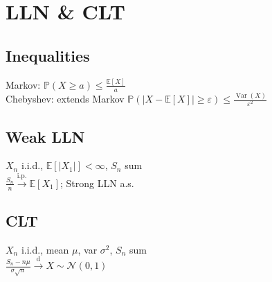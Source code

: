 \section{LLN \& CLT}
	\subsection*{Inequalities}
	Markov: $\mathbb{P}\left(X\geq a\right)\leq\frac{\mathbb{E}\left[X\right]}{a}$\\
	Chebyshev: extends Markov $\mathbb{P}\left(\left|X - \mathbb{E}\left[X\right]\right|\geq\varepsilon\right)\leq\frac{\operatorname{Var}\left(X\right)}{\varepsilon^{2}}$
	
	\subsection*{Weak LLN}
	$X_{n}$ i.i.d., $\mathbb{E}\left[\left|X_{1}\right|\right] < \infty$, $S_{n}$ sum\\
	$\frac{S_{n}}{n}\stackrel{\text{i.p.}}{\to}\mathbb{E}\left[X_{1}\right]$; Strong LLN a.s.
	
	\subsection*{CLT}
	$X_{n}$ i.i.d., mean $\mu$, var $\sigma^{2}$, $S_{n}$ sum\\
	$\frac{S_{n} - n\mu}{\sigma\sqrt{n}}\stackrel{\text{d}}{\to}X\sim\mathcal{N}\left(0, 1\right)$
